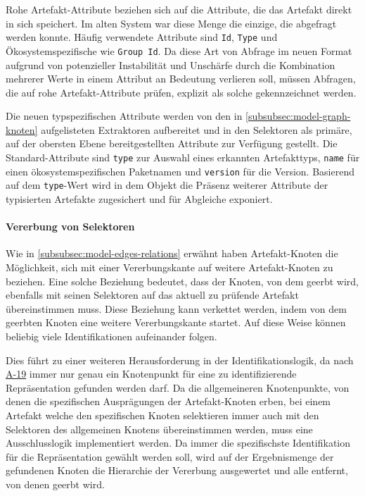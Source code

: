 Rohe Artefakt-Attribute beziehen sich auf die Attribute, die das Artefakt direkt in sich speichert.
Im alten System war diese Menge die einzige, die abgefragt werden konnte.
Häufig verwendete Attribute sind \texttt{Id}, \texttt{Type} und Ökosystemspezifische wie \texttt{Group Id}.
Da diese Art von Abfrage im neuen Format aufgrund von potenzieller Instabilität und Unschärfe durch die Kombination mehrerer Werte in einem Attribut an Bedeutung verlieren soll, müssen Abfragen, die auf rohe Artefakt-Attribute prüfen, explizit als solche gekennzeichnet werden.

Die neuen typspezifischen Attribute werden von den in \autoref{subsubsec:model-graph-knoten} aufgelisteten Extraktoren aufbereitet und in den Selektoren als primäre, auf der obersten Ebene bereitgestellten Attribute zur Verfügung gestellt.
Die Standard-Attribute sind \texttt{type} zur Auswahl eines erkannten Artefakttyps, \texttt{name} für einen ökosystemspezifischen Paketnamen und \texttt{version} für die Version.
Basierend auf dem \texttt{type}-Wert wird in dem Objekt die Präsenz weiterer Attribute der typisierten Artefakte zugesichert und für Abgleiche exponiert.

\paragraph{Vererbung von Selektoren}

Wie in \autoref{subsubsec:model-edges-relations} erwähnt haben Artefakt-Knoten die Möglichkeit, sich mit einer Vererbungskante auf weitere Artefakt-Knoten zu beziehen.
Eine solche Beziehung bedeutet, dass der Knoten, von dem geerbt wird, ebenfalls mit seinen Selektoren auf das aktuell zu prüfende Artefakt übereinstimmen muss.
Diese Beziehung kann verkettet werden, indem von dem geerbten Knoten eine weitere Vererbungskante startet.
Auf diese Weise können beliebig viele Identifikationen aufeinander folgen.

Dies führt zu einer weiteren Herausforderung in der Identifikationslogik, da nach \hyperref[subsec:req-graph-inner-consistency]{A-19} immer nur genau ein Knotenpunkt für eine zu identifizierende Repräsentation gefunden werden darf.
Da die allgemeineren Knotenpunkte, von denen die spezifischen Ausprägungen der Artefakt-Knoten erben, bei einem Artefakt welche den spezifischen Knoten selektieren immer auch mit den Selektoren des allgemeinen Knotens übereinstimmen werden, muss eine Ausschlusslogik implementiert werden.
Da immer die spezifischste Identifikation für die Repräsentation gewählt werden soll, wird auf der Ergebnismenge der gefundenen Knoten die Hierarchie der Vererbung ausgewertet und alle entfernt, von denen geerbt wird.

